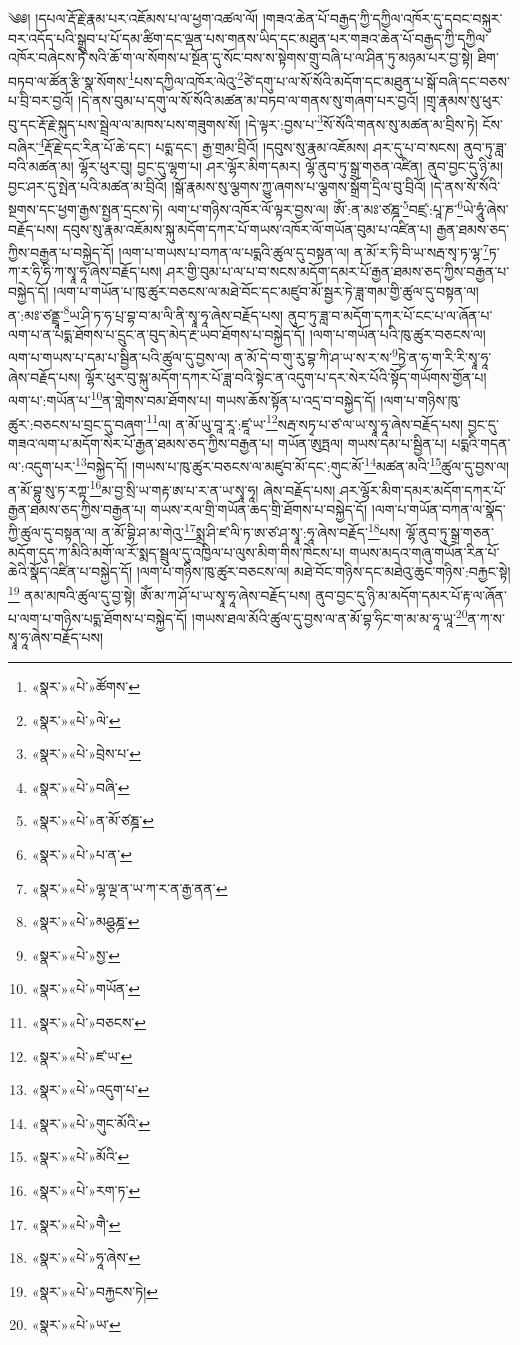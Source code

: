༄༅། །དཔལ་རྡོ་རྗེ་རྣམ་པར་འཇོམས་པ་ལ་ཕྱག་འཚལ་ལོ། །གཟའ་ཆེན་པོ་བརྒྱད་ཀྱི་དཀྱིལ་འཁོར་དུ་དབང་བསྐུར་བར་འདོད་པའི་སྒྲུབ་པ་པོ་དམ་ཚིག་དང་ལྡན་པས་གནས་ཡིད་དང་མཐུན་པར་གཟའ་ཆེན་པོ་བརྒྱད་ཀྱི་དཀྱིལ་འཁོར་བཞེངས་ཏེ་སའི་ཆོ་ག་ལ་སོགས་པ་སྔོན་དུ་སོང་བས་ས་སྟེགས་གྲུ་བཞི་པ་ལ་ཤིན་ཏུ་མཉམ་པར་བྱ་སྟེ། ཐིག་བཏབ་ལ་ཚོན་རྩི་སྣ་སོགས་\footnote{«སྣར་»«པེ་»ཚོགས་}པས་དཀྱིལ་འཁོར་ལེའུ་\footnote{«སྣར་»«པེ་»ལེ་}ཙེ་དགུ་པ་ལ་སོ་སོའི་མདོག་དང་མཐུན་པ་སྒོ་བཞི་དང་བཅས་པ་བྲི་བར་བྱའོ། །དེ་ནས་བུམ་པ་དགུ་ལ་སོ་སོའི་མཚན་མ་བཏབ་ལ་གནས་སུ་གཞག་པར་བྱའོ། །གྲྭ་རྣམས་སུ་ཕུར་བུ་དང་རྡོ་རྗེ་སྐུད་པས་སྦྲེལ་ལ་མཁས་པས་གཟུགས་སོ། །དེ་ལྟར་:བྱས་པ་\footnote{«སྣར་»«པེ་»བྲེས་པ་}སོ་སོའི་གནས་སུ་མཚན་མ་བྲིས་ཏེ། ངོས་བཞིར་\footnote{«སྣར་»«པེ་»བཞི་}རྡོ་རྗེ་དང་རིན་པོ་ཆེ་དང་། པདྨ་དང་། རྒྱ་གྲམ་བྲིའོ། །དབུས་སུ་རྣམ་འཇོམས། ཤར་དུ་པ་བ་སངས། ནུབ་ཏུ་ཟླ་བའི་མཚན་མ། ལྷོར་ཕུར་བུ། བྱང་དུ་ལྷག་པ། ཤར་ལྷོར་མིག་དམར། ལྷོ་ནུབ་ཏུ་སྒྲ་གཅན་འཛིན། ནུབ་བྱང་དུ་ཉི་མ། བྱང་ཤར་དུ་སྤེན་པའི་མཚན་མ་བྲིའོ། །སྒོ་རྣམས་སུ་ལྕགས་ཀྱུ་ཞགས་པ་ལྕགས་སྒྲོག་དྲིལ་བུ་བྲིའོ། །དེ་ནས་སོ་སོའི་སྔགས་དང་ཕྱག་རྒྱས་སྤྱན་དྲངས་ཏེ། ལག་པ་གཉིས་འཁོར་ལོ་ལྟར་བྱས་ལ། ཨོཾ་:ན་མཿ་ཙཎྜ་\footnote{«སྣར་»«པེ་»ན་མོ་ཙཎྜ་}བཛྲ་:པཱ་ཎ་\footnote{«སྣར་»«པེ་»པ་ན་}ཡེ་ཧཱུཾ་ཞེས་བརྗོད་པས། དབུས་སུ་རྣམ་འཇོམས་སྐུ་མདོག་དཀར་པོ་གཡས་འཁོར་ལོ་གཡོན་བུམ་པ་འཛིན་པ། རྒྱན་ཐམས་ཅད་ཀྱིས་བརྒྱན་པ་བསྐྱེད་དོ། །ལག་པ་གཡས་པ་བཀན་ལ་པདྨའི་ཚུལ་དུ་བསྟན་ལ། ན་མོ་ར་ཏི་བི་ཡ་སརྦ་སྭ་ཏ་ལྷ་\footnote{«སྣར་»«པེ་»ལྷ་ལྔ་ན་ཡ་ཀ་ར་ན་རྒྱ་ནན་}ཏ་ཀ་ར་ཧི་ཧི་ཀ་སྭཱ་ཧཱ་ཞེས་བརྗོད་པས། ཤར་གྱི་བུམ་པ་ལ་པ་བ་སངས་མདོག་དམར་པོ་རྒྱན་ཐམས་ཅད་ཀྱིས་བརྒྱན་པ་བསྐྱེད་དོ། །ལག་པ་གཡོན་པ་ཁུ་ཚུར་བཅངས་ལ་མཐེ་བོང་དང་མཛུབ་མོ་སྦྱར་ཏེ་ཟླ་གམ་གྱི་ཚུལ་དུ་བསྟན་ལ། ན་:མཿ་ཙནྡྲཱ་\footnote{«སྣར་»«པེ་»མཤྩཎྜ་}ཡ་ཤི་ཏ་ཧ་པྲ་བྷ་བ་མ་ལི་ནི་སྭཱ་ཧཱ་ཞེས་བརྗོད་པས། ནུབ་ཏུ་ཟླ་བ་མདོག་དཀར་པོ་ངང་པ་ལ་ཞོན་པ་ལག་པ་ན་པདྨ་ཐོགས་པ་དྲུང་ན་བུད་མེད་རྔ་ཡབ་ཐོགས་པ་བསྐྱེད་དོ། །ལག་པ་གཡོན་པའི་ཁུ་ཚུར་བཅངས་ལ། ལག་པ་གཡས་པ་དམ་པ་སྦྱིན་པའི་ཚུལ་དུ་བྱས་ལ། ན་མོ་དེ་བ་གུ་རུ་བྷ་ཀི་ཤ་ཡ་ས་ར་ས་\footnote{«སྣར་»«པེ་»སྱ་}ཏྱེ་ན་ཧ་ག་རི་རི་སྭཱ་ཧཱ་ཞེས་བརྗོད་པས། ལྷོར་ཕུར་བུ་སྐུ་མདོག་དཀར་པོ་ཟླ་བའི་སྟེང་ན་འདུག་པ་དར་སེར་པོའི་སྟོད་གཡོགས་གྱོན་པ། ལག་པ་:གཡོན་པ་\footnote{«སྣར་»«པེ་»གཡོན་}ན་གླེགས་བམ་ཐོགས་པ། གཡས་ཆོས་སྟོན་པ་འདྲ་བ་བསྐྱེད་དོ། །ལག་པ་གཉིས་ཁུ་ཚུར་:བཅངས་པ་བྲང་དུ་བཞག་\footnote{«སྣར་»«པེ་»བཅངས་}ལ། ན་མོ་ཡུ་བཱ་རཱ་:ཛཱ་ཡ་\footnote{«སྣར་»«པེ་»ཛ་ཡ་}སརྦ་སཏྭ་པ་ཙ་ལ་ཡ་སྭཱ་ཧཱ་ཞེས་བརྗོད་པས། བྱང་དུ་གཟའ་ལག་པ་མདོག་སེར་པོ་རྒྱན་ཐམས་ཅད་ཀྱིས་བརྒྱན་པ། གཡོན་ཨུཏྤལ། གཡས་དམ་པ་སྦྱིན་པ། པདྨའི་གདན་ལ་:འདུག་པར་\footnote{«སྣར་»«པེ་»འདུག་པ་}བསྐྱེད་དོ། །གཡས་པ་ཁུ་ཚུར་བཅངས་ལ་མཛུབ་མོ་དང་:གུང་མོ་\footnote{«སྣར་»«པེ་»གུང་མོའི་}མཚན་མའི་\footnote{«སྣར་»«པེ་»མོའི་}ཚུལ་དུ་བྱས་ལ། ན་མོ་བྷུ་སུ་ཏ་རཀྟ་\footnote{«སྣར་»«པེ་»རག་ཏ་}མ་བྱ་སྲི་ཡ་གརྟ་ཨ་པ་ར་ན་ཡ་སྭཱ་ཧཱ། ཞེས་བརྗོད་པས། ཤར་ལྷོར་མིག་དམར་མདོག་དཀར་པོ་རྒྱན་ཐམས་ཅད་ཀྱིས་བརྒྱན་པ། གཡས་རལ་གྲི་གཡོན་ཆད་གྲི་ཐོགས་པ་བསྐྱེད་དོ། །ལག་པ་གཡོན་བཀན་ལ་སྣོད་ཀྱི་ཚུལ་དུ་བསྟན་ལ། ན་མོ་བྷི་ཤ་མ་གེའུ་\footnote{«སྣར་»«པེ་»གཻ་}སྨྲ་ཤི་ཛ་ལི་ཏ་ཨ་ཙ་ཤ་སྭཱ་:ཧཱ་ཞེས་བརྗོད་\footnote{«སྣར་»«པེ་»ཧཱ་ཞེས་}པས། ལྷོ་ནུབ་ཏུ་སྒྲ་གཅན་མདོག་དུད་ཀ་མིའི་མགོ་ལ་རོ་སྨད་སྦྲུལ་དུ་འཁྱིལ་པ་ལུས་མིག་གིས་ཁེངས་པ། གཡས་མདའ་གཞུ་གཡོན་རིན་པོ་ཆེའི་སྣོད་འཛིན་པ་བསྐྱེད་དོ། །ལག་པ་གཉིས་ཁུ་ཚུར་བཅངས་ལ། མཐེ་བོང་གཉིས་དང་མཐེའུ་ཆུང་གཉིས་:བརྐྱང་སྟེ།\footnote{«སྣར་»«པེ་»བརྐྱངས་ཏེ།} ནམ་མཁའི་ཚུལ་དུ་བྱ་སྟེ། ཨོཾ་མ་ཀ་ཤོ་པ་ཡ་སྭཱ་ཧཱ་ཞེས་བརྗོད་པས། ནུབ་བྱང་དུ་ཉི་མ་མདོག་དམར་པོ་རྟ་ལ་ཞོན་པ་ལག་པ་གཉིས་པདྨ་ཐོགས་པ་བསྐྱེད་དོ། །གཡས་ཐལ་མོའི་ཚུལ་དུ་བྱས་ལ་ན་མོ་བྷ་ཧིང་ག་མ་མ་ཧཱ་ཡཱ་\footnote{«སྣར་»«པེ་»ཡ་}ན་ཀ་ས་སྭཱ་ཧཱ་ཞེས་བརྗོད་པས། 